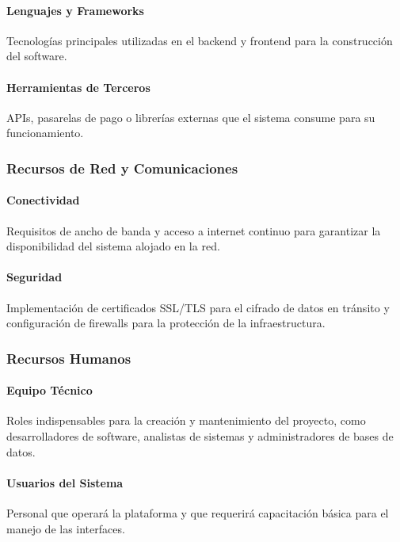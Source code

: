 \paragraph{Lenguajes y Frameworks} Tecnologías principales utilizadas en el backend y frontend para la construcción del software.

\paragraph{Herramientas de Terceros} APIs, pasarelas de pago o librerías externas que el sistema consume para su funcionamiento.

\subsubsection{Recursos de Red y Comunicaciones}

\paragraph{Conectividad} Requisitos de ancho de banda y acceso a internet continuo para garantizar la disponibilidad del sistema alojado en la red.

\paragraph{Seguridad} Implementación de certificados SSL/TLS para el cifrado de datos en tránsito y configuración de firewalls para la protección de la infraestructura.

\subsubsection{Recursos Humanos}

\paragraph{Equipo Técnico} Roles indispensables para la creación y mantenimiento del proyecto, como desarrolladores de software, analistas de sistemas y administradores de bases de datos.

\paragraph{Usuarios del Sistema} Personal que operará la plataforma y que requerirá capacitación básica para el manejo de las interfaces.




